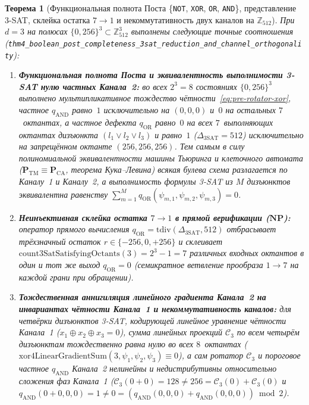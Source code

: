 \documentclass[11pt,a4paper]{article}
\theoremstyle{plain}
\newtheorem{theorem}{Теорема}[section]
\theoremstyle{definition}
\begin{document}
\begin{theorem}[Функциональная полнота Поста \{\texttt{NOT}, \texttt{XOR}, \texttt{OR}, \texttt{AND}\}, представление 3-SAT, склейка остатка $7\to 1$ и некоммутативность двух каналов на $\mathbb{Z}_{512}$]
\label{thm:main-4}
При $d=3$ на полюсах $\{0,256\}^3\subset\mathbb{Z}_{512}^3$ выполнены следующие точные соотношения (\texttt{thm4\_boolean\_post\_completeness\_3sat\_reduction\_and\_channel\_orthogonality}):
\begin{enumerate}[label=\textbf{(\roman*)},leftmargin=*]
\item \textbf{Функциональная полнота Поста и эквивалентность выполнимости 3-SAT нулю частных Канала~2:}
  во всех $2^3=8$ состояниях $\{0,256\}^3$ выполнено мультипликативное тождество чётности~\eqref{eq:pre-rotator-xor}, частное $q_{\mathrm{AND}}$ равно~$1$ исключительно на $(0,0,0)$ и~$0$ на остальных $7$~октантах, а частное дефекта $q_{\mathrm{OR}}$ равно~$0$ на всех $7$~выполняющих октантах дизъюнкта $(l_1\lor l_2\lor l_3)$ и равно~$1$ ($\Delta_{\mathrm{3SAT}}=512$) исключительно на запрещённом октанте $(256,256,256)$. Тем самым в силу полиномиальной эквивалентности машины Тьюринга и клеточного автомата ($\mathbf{P}_{\mathrm{TM}}\equiv\mathbf{P}_{\mathrm{CA}}$, теорема Кука--Левина) всякая булева схема разлагается по Каналу~1 и Каналу~2, а выполнимость формулы 3-SAT из $M$ дизъюнктов эквивалентна равенству $\sum_{m=1}^M q_{\mathrm{OR}}(\psi_{m,1},\psi_{m,2},\psi_{m,3}) = 0$.
\item \textbf{Неинъективная склейка остатка $7\to 1$ в прямой верификации ($\mathbf{NP}$):}
  оператор прямого вычисления $q_{\mathrm{OR}}=\mathrm{tdiv}(\Delta_{\mathrm{3SAT}},512)$ отбрасывает трёхзначный остаток $r\in\{-256,0,+256\}$ и склеивает $\mathrm{count3SatSatisfyingOctants}(3)=2^3-1=7$ различных входных октантов в один и тот же выход $q_{\mathrm{OR}}=0$ (семикратное ветвление прообраза $1\to 7$ на каждой грани при обращении).
\item \textbf{Тождественная аннигиляция линейного градиента Канала~2 на инвариантах чётности Канала~1 и некоммутативность каналов:}
  для четвёрки дизъюнктов 3-SAT, кодирующей линейное уравнение чётности Канала~1 ($x_1\oplus x_2\oplus x_3=0$), сумма линейных проекций $\mathcal{C}_3$ по всем четырём дизъюнктам тождественно равна нулю во всех $8$~октантах ($\mathrm{xor4LinearGradientSum}(3,\psi_1,\psi_2,\psi_3)\equiv 0$), а сам ротатор $\mathcal{C}_3$ и пороговое частное $q_{\mathrm{AND}}$ Канала~2 нелинейны и недистрибутивны относительно сложения фаз Канала~1 ($\mathcal{C}_3(0+0)=128\ne 256=\mathcal{C}_3(0)+\mathcal{C}_3(0)$ и $q_{\mathrm{AND}}(0+0,0,0)=1\ne 0=(q_{\mathrm{AND}}(0,0,0)+q_{\mathrm{AND}}(0,0,0))\bmod 2$).

\end{enumerate}
\end{theorem}
\end{document}

